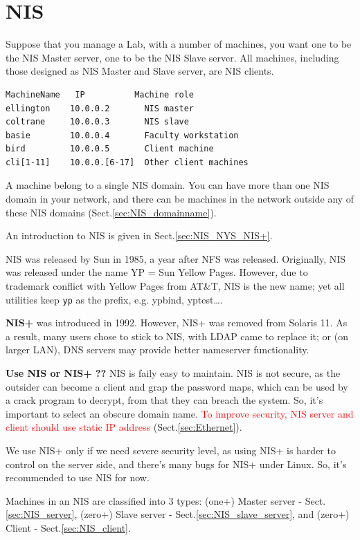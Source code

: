 \section{NIS}
\label{sec:NIS}

Suppose that you manage a Lab, with a number of machines, you want one to be the
NIS Master server, one to be the NIS Slave server. All machines, including those
designed as NIS Master and Slave server, are NIS clients.
\begin{verbatim}
MachineName   IP          Machine role
ellington    10.0.0.2       NIS master
coltrane     10.0.0.3       NIS slave
basie        10.0.0.4       Faculty workstation
bird         10.0.0.5       Client machine
cli[1-11]    10.0.0.[6-17]  Other client machines
\end{verbatim}
A machine belong to a single NIS domain. You can have more than one NIS domain
in your network, and there can be machines in the network outside any of these
NIS domains (Sect.\ref{sec:NIS_domainname}). 

An introduction to NIS is given in Sect.\ref{sec:NIS_NYS_NIS+}.

\begin{framed}
NIS was released by Sun in 1985, a year after NFS was released. Originally, NIS
was released under the name YP = Sun Yellow Pages. However, due to
trademark conflict with Yellow Pages from AT\&T, NIS is the new name;
yet all utilities keep \verb!yp! as the prefix, e.g. ypbind, yptest\ldots.

{\bf NIS+} was introduced in 1992. However, NIS+ was removed from Solaris 11. As
a result, many users chose to stick to NIS, with LDAP came to replace it; or
(on larger LAN), DNS servers may provide better nameserver functionality.

{\bf Use NIS or NIS+ ??} NIS is faily easy to maintain. NIS is not secure, as
the outsider can become a client and grap the password maps, which can be used
by a crack program to decrypt, from that they can breach the system. So, it's
important to select an obscure domain name. \textcolor{red}{To improve security,
NIS server and client should use static IP address} (Sect.\ref{sec:Ethernet}). 

We use NIS+ only if we need severe security level, as using NIS+ is harder to
control on the server side, and there's many bugs for NIS+ under Linux. So, it's
recommended to use NIS for now. 
\end{framed}


Machines in an NIS are classified into 3 types: (one+) Master server -
Sect.\ref{sec:NIS_server}, (zero+) Slave server -
Sect.\ref{sec:NIS_slave_server}, and (zero+) Client - Sect.\ref{sec:NIS_client}.


